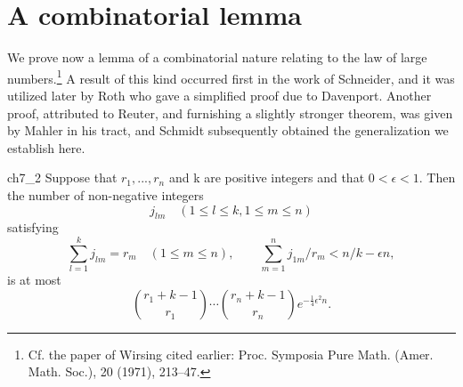 \section{A combinatorial lemma}\label{sec:ch7_4}

We prove now a lemma of a combinatorial nature relating to the law of large numbers.\footnote{Cf. the paper of Wirsing cited earlier: Proc. Symposia Pure Math. (Amer. Math. Soc.), 20 (1971), 213--47.} A result of this kind occurred first in the work of Schneider, and it was utilized later by Roth who gave a simplified proof due to Davenport. Another proof, attributed to Reuter, and furnishing a slightly stronger theorem, was given by Mahler in his tract, and Schmidt subsequently obtained the generalization we establish here.

\begin{mylemma}{}{ch7_2}
Suppose that  $r_1, ..., r_n$  and k are positive integers and that  $0 < \epsilon < 1$. Then the number of non-negative integers
\[j_{lm} \quad (1 \leqslant l \leqslant k, 1 \leqslant m \leqslant n)\]
satisfying
\[\sum_{l=1}^k j_{lm} = r_m \quad (1 \leqslant m \leqslant n), \qquad \sum_{m=1}^n j_{1m}/r_m < n/k - \epsilon n,\]
is at most
\[\binom{r_1+k-1}{r_1}\cdots\binom{r_n+k-1}{r_n}e^{-\frac{1}{4}\epsilon^2n}.\]
\end{mylemma}

